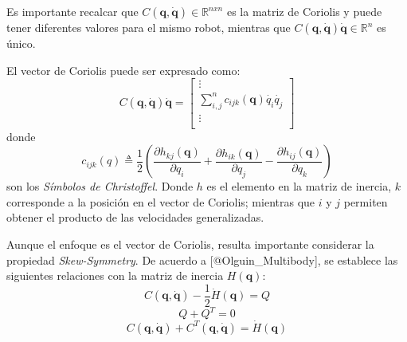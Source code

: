     Es importante recalcar que $C(\boldsymbol{q}, \boldsymbol{\dot{q}}) \in \mathbb{R}^{nxn}$ es la matriz de Coriolis y puede tener diferentes valores para el mismo robot, 
    mientras que $C(\boldsymbol{q}, \boldsymbol{\dot{q}}) \boldsymbol{\dot{q}} \in \mathbb{R}^n$ es único.

    El vector de Coriolis puede ser expresado como:
    \begin{equation}
        \label{eqn:coriolis_vector}
        C(\boldsymbol{q}, \boldsymbol{\dot{q}}) \boldsymbol{\dot{q}} = \begin{bmatrix} \vdots\\
        \sum_{i,j}^{n} c_{ijk}(\boldsymbol{q})\dot{q_{i}}\dot{q_{j}}   \\  \vdots\\ \end{bmatrix}
    \end{equation}
    donde 
    \begin{equation}
        \label{eqn:christoffel}
        c_{ijk}(q) \triangleq \frac{1}{2}\left( \frac{\partial h_{kj}(\boldsymbol{q})}{\partial q_{i}}+\frac{\partial h_{ik}(\boldsymbol{q})}{\partial q_{j}}
        -\frac{\partial h_{ij}(\boldsymbol{q})}{\partial q_{k}} \right)
    \end{equation}
    son los \emph{Símbolos de Christoffel}. Donde $h$ es el elemento en la matriz de inercia, $k$ corresponde a la posición en el vector de Coriolis; 
    mientras que $i$ y $j$ permiten obtener el producto de las velocidades generalizadas. 

    Aunque el enfoque es el vector de Coriolis, resulta importante considerar la propiedad \emph{Skew-Symmetry}. De acuerdo a [@Olguin_Multibody],
    se establece las siguientes relaciones con la matriz de inercia $H(\boldsymbol{q})$:
    \begin{equation}
        \label{eqn:skew1}
        C(\boldsymbol{q}, \boldsymbol{\dot{q}}) - \frac{1}{2}\dot{H}(\boldsymbol{q}) = Q 
    \end{equation}
    \begin{equation}
        \label{eqn:skew2}
        Q + Q^T = 0
    \end{equation}
    \begin{equation}
        \label{eqn:skew3}
        C(\boldsymbol{q}, \boldsymbol{\dot{q}}) + C^T(\boldsymbol{q}, \boldsymbol{\dot{q}}) = \dot{H}(\boldsymbol{q})
    \end{equation}

